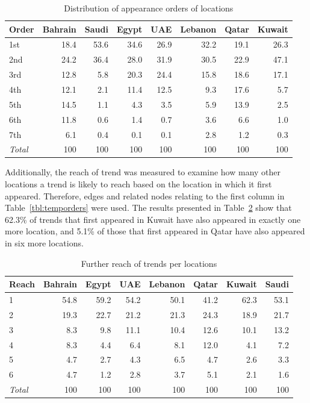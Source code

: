 \documentclass{llncs}
\begin{document}
\begin{table}[!h]
\centering
\caption{Distribution of appearance orders of locations}
\begin{tabular}{@{}lrrrrrrr@{}}
\toprule
Order & Bahrain & Saudi & Egypt & UAE & Lebanon & Qatar & Kuwait \\ 
\midrule
1st &  18.4 & 53.6 & 34.6 & 26.9 & 32.2 & 19.1 & 26.3 \\
2nd & 24.2 & 36.4 & 28.0 & 31.9 & 30.5 & 22.9 & 47.1\\
3rd &  12.8 & 5.8 & 20.3 & 24.4 & 15.8 & 18.6 &  17.1\\
4th &  12.1 & 2.1 & 11.4 & 12.5 & 9.3 & 17.6 & 5.7 \\
5th &  14.5 & 1.1 & 4.3 & 3.5 & 5.9 & 13.9 & 2.5 \\
6th &  11.8 & 0.6 & 1.4 & 0.7 & 3.6 &  6.6 & 1.0 \\
7th &  6.1 & 0.4 & 0.1 & 0.1 & 2.8 &  1.2 &  0.3\\
\midrule
{\emph{Total}} & 100 & 100 & 100 & 100 & 100 &  100 &   100\\
\bottomrule
\end{tabular}
\label{tbl:appearanceorders}
\end{table}

Additionally, the reach of trend was measured to examine how many
other locations a trend is likely to reach based on the location in which
it first appeared. Therefore, edges and related nodes relating to the
first column in Table~\ref{tbl:temporders} were used. The results
presented in Table~\ref{tbl:furtherreach} show that 62.3\% of trends
that first appeared in Kuwait have also appeared in exactly one more location,
and 5.1\% of those that first appeared in Qatar have also appeared in
six more locations.

\begin{table}[!h]
\centering
\caption{Further reach of trends per locations}
\begin{tabular}{@{}lrrrrrrr@{}}
\toprule
Reach & Bahrain & Egypt & UAE & Lebanon & Qatar & Kuwait & Saudi \\ 
\midrule
1 &  54.8 & 59.2 & 54.2 & 50.1 & 41.2 & 62.3 & 53.1 \\
2 &  19.3 & 22.7 & 21.2 & 21.3 & 24.3 & 18.9 & 21.7\\
3 &    8.3 & 9.8  & 11.1 & 10.4 & 12.6 & 10.1 & 13.2\\
4 &    8.3 & 4.4 & 6.4 & 8.1 & 12.0 & 4.1 & 7.2 \\
5 &    4.7 & 2.7 & 4.3 & 6.5 & 4.7 & 2.6 & 3.3 \\
6 &    4.7 & 1.2 & 2.8 & 3.7 & 5.1 & 2.1& 1.6\\
\midrule
{\emph{Total}} & 100 & 100 & 100 & 100 & 100 &  100 &   100\\
\bottomrule
\end{tabular}
\label{tbl:furtherreach}
\end{table}
\end{document}
